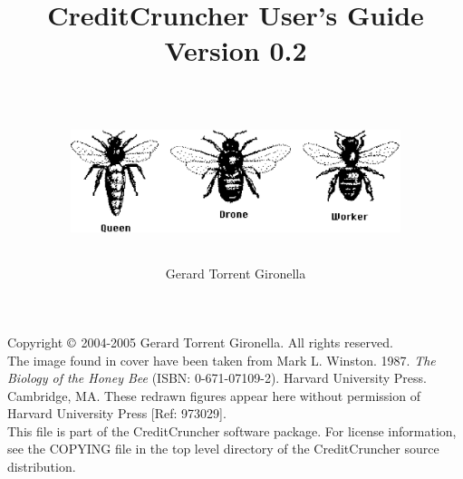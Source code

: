 
%
%
%
%
%
%
%
%

\title{CreditCruncher User's Guide \\
Version 0.2 \\
\ \\
\centerline{\includegraphics[height=3cm, angle=0]{./images/threebees.eps}}
}

\author{Gerard Torrent Gironella}

\maketitle

\thispagestyle{empty}

\newpage

\vspace*{6in}

\noindent Copyright $\copyright$ 2004-2005 Gerard Torrent Gironella. All rights reserved.\\

\noindent The image found in cover have been taken from Mark L. Winston. 1987. 
\emph{The Biology of the Honey Bee} (ISBN: 0-671-07109-2). Harvard University 
Press. Cambridge, MA. These redrawn figures appear here without permission of 
Harvard University Press [Ref: 973029].\\

\noindent This file is part of the CreditCruncher software package.  For
license information, see the COPYING file in the top level directory
of the CreditCruncher source distribution.
